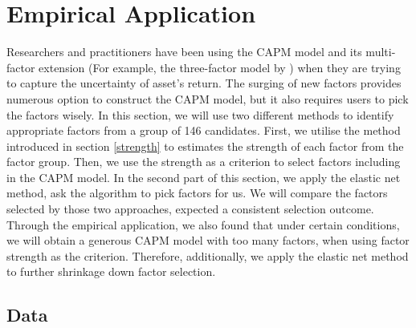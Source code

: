 




%
	\section{Empirical Application}\label{Empirical}
	
Researchers and practitioners have been using the CAPM model \cite{Sharpe1964, Lintner1965, Black1972} and its multi-factor extension (For example, the three-factor model by ) when they are trying to capture the uncertainty of asset's return.
The surging of new factors \cite{Harvey2019} provides numerous option to construct the CAPM model, but it also requires users to pick the factors wisely.
In this section, we will use two different methods to identify appropriate factors from a group of 146 candidates.
First, we utilise the method introduced in section \ref{strength} to estimates the strength of each factor from the factor group.
Then, we use the strength as a criterion to select factors including in the CAPM model.
In the second part of this section, we apply the elastic net method, ask the algorithm to pick factors for us.
We will compare the factors selected by those two approaches, expected a consistent selection outcome.
Through the empirical application, we also found that under certain conditions, we will obtain a generous CAPM model with too many factors, when using factor strength as the criterion.
Therefore, additionally, we apply the elastic net method to further shrinkage down factor selection.
	\subsection{Data}\label{data}
	
